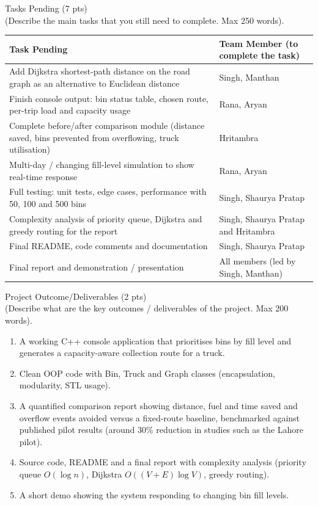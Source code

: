 \documentclass[10pt,a4paper]{article}
\newcommand{\sectionhead}[2]{%
  \needspace{8\baselineskip}
  \vspace{6pt}
  {\Large\color{headblue}#1}\\[-2pt]
  {\small\color{hintgrey}#2}\par\vspace{2pt}}
\newcommand{\hrow}{\rowcolor{tablehead}}
\begin{document}
\sectionhead{Tasks Pending (7 pts)}{(Describe the main tasks that you still need to complete. Max 250 words).}
\noindent
\begin{tabularx}{\textwidth}{|X|L{0.30\textwidth}|}
\hline
\hrow \textbf{Task Pending} & \textbf{Team Member (to complete the task)} \\ \hline
Add Dijkstra shortest-path distance on the road graph as an alternative to Euclidean distance & Singh, Manthan \\ \hline
Finish console output: bin status table, chosen route, per-trip load and capacity usage & Rana, Aryan \\ \hline
Complete before/after comparison module (distance saved, bins prevented from overflowing, truck utilisation) & Hritambra \\ \hline
Multi-day / changing fill-level simulation to show real-time response & Rana, Aryan \\ \hline
Full testing: unit tests, edge cases, performance with 50, 100 and 500 bins & Singh, Shaurya Pratap \\ \hline
Complexity analysis of priority queue, Dijkstra and greedy routing for the report & Singh, Shaurya Pratap and Hritambra \\ \hline
Final README, code comments and documentation & Singh, Shaurya Pratap \\ \hline
Final report and demonstration / presentation & All members (led by Singh, Manthan) \\ \hline
\end{tabularx}

\sectionhead{Project Outcome/Deliverables (2 pts)}{(Describe what are the key outcomes / deliverables of the project. Max 200 words).}
\begin{answerbox}
\begin{enumerate}[leftmargin=*,itemsep=2pt,topsep=0pt]
\item A working C++ console application that prioritises bins by fill level and generates a capacity-aware collection route for a truck.
\item Clean OOP code with Bin, Truck and Graph classes (encapsulation, modularity, STL usage).
\item A quantified comparison report showing distance, fuel and time saved and overflow events avoided versus a fixed-route baseline, benchmarked against published pilot results (around 30\% reduction in studies such as the Lahore pilot).
\item Source code, README and a final report with complexity analysis (priority queue $O(\log n)$, Dijkstra $O((V+E)\log V)$, greedy routing).
\item A short demo showing the system responding to changing bin fill levels.
\end{enumerate}
\end{answerbox}
\end{document}
